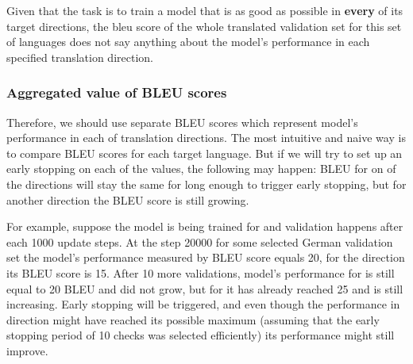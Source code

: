 
Given that the task is to train a model that is as good as possible in
\textbf{every} of its target directions, the \acrshort{bleu} score of
the whole translated validation set for this set of languages does not
say anything about the model's performance in each specified
translation direction.

\subsubsection*{Aggregated value of BLEU scores}

Therefore, we should use separate BLEU scores which represent
model's performance in each of translation directions.
The most intuitive and naive way is to compare BLEU scores
for each target language.
But if we will try to set up an early stopping on each of the values,
the following may happen: BLEU for on of the directions will stay the
same for long enough to trigger early stopping, but for another direction
the BLEU score is still growing.

For example, suppose the model is being trained for 
and validation happens after each 1000 update steps.
At the step 20000 for some selected German validation set
the model's  performance measured by BLEU score
equals 20, for the  direction its BLEU score is 15.
After 10 more validations, model's performance for 
is still equal to 20 BLEU and did not grow, but for  
it has already reached 25 and is still increasing.
Early stopping will be triggered, and even though the performance
in  direction might have reached its possible maximum
(assuming that the early stopping period of 10 checks was selected
efficiently) its  performance might still improve.



\subsection{}
\label{subsection:testing}

